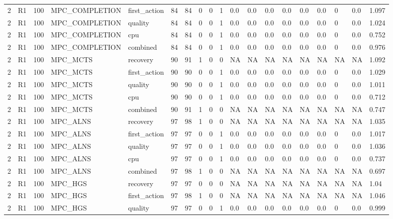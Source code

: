 \begin{tabular}{lllllllllllllllllll}
2 & R1 & 100 & MPC\_COMPLETION & first\_action & 84 & 84 & 0 & 0 & 1 & 0.0 & 0.0 & 0.0 & 0.0 & 0.0 & 0.0 & 0 & 0.0 & 1.097 \\
2 & R1 & 100 & MPC\_COMPLETION & quality & 84 & 84 & 0 & 0 & 1 & 0.0 & 0.0 & 0.0 & 0.0 & 0.0 & 0.0 & 0 & 0.0 & 1.024 \\
2 & R1 & 100 & MPC\_COMPLETION & cpu & 84 & 84 & 0 & 0 & 1 & 0.0 & 0.0 & 0.0 & 0.0 & 0.0 & 0.0 & 0 & 0.0 & 0.752 \\
2 & R1 & 100 & MPC\_COMPLETION & combined & 84 & 84 & 0 & 0 & 1 & 0.0 & 0.0 & 0.0 & 0.0 & 0.0 & 0.0 & 0 & 0.0 & 0.976 \\
2 & R1 & 100 & MPC\_MCTS & recovery & 90 & 91 & 1 & 0 & 0 & NA & NA & NA & NA & NA & NA & NA & NA & 1.092 \\
2 & R1 & 100 & MPC\_MCTS & first\_action & 90 & 90 & 0 & 0 & 1 & 0.0 & 0.0 & 0.0 & 0.0 & 0.0 & 0.0 & 0 & 0.0 & 1.029 \\
2 & R1 & 100 & MPC\_MCTS & quality & 90 & 90 & 0 & 0 & 1 & 0.0 & 0.0 & 0.0 & 0.0 & 0.0 & 0.0 & 0 & 0.0 & 1.011 \\
2 & R1 & 100 & MPC\_MCTS & cpu & 90 & 90 & 0 & 0 & 1 & 0.0 & 0.0 & 0.0 & 0.0 & 0.0 & 0.0 & 0 & 0.0 & 0.712 \\
2 & R1 & 100 & MPC\_MCTS & combined & 90 & 91 & 1 & 0 & 0 & NA & NA & NA & NA & NA & NA & NA & NA & 0.747 \\
2 & R1 & 100 & MPC\_ALNS & recovery & 97 & 98 & 1 & 0 & 0 & NA & NA & NA & NA & NA & NA & NA & NA & 1.035 \\
2 & R1 & 100 & MPC\_ALNS & first\_action & 97 & 97 & 0 & 0 & 1 & 0.0 & 0.0 & 0.0 & 0.0 & 0.0 & 0.0 & 0 & 0.0 & 1.017 \\
2 & R1 & 100 & MPC\_ALNS & quality & 97 & 97 & 0 & 0 & 1 & 0.0 & 0.0 & 0.0 & 0.0 & 0.0 & 0.0 & 0 & 0.0 & 1.036 \\
2 & R1 & 100 & MPC\_ALNS & cpu & 97 & 97 & 0 & 0 & 1 & 0.0 & 0.0 & 0.0 & 0.0 & 0.0 & 0.0 & 0 & 0.0 & 0.737 \\
2 & R1 & 100 & MPC\_ALNS & combined & 97 & 98 & 1 & 0 & 0 & NA & NA & NA & NA & NA & NA & NA & NA & 0.697 \\
2 & R1 & 100 & MPC\_HGS & recovery & 97 & 97 & 0 & 0 & 0 & NA & NA & NA & NA & NA & NA & NA & NA & 1.04 \\
2 & R1 & 100 & MPC\_HGS & first\_action & 97 & 98 & 1 & 0 & 0 & NA & NA & NA & NA & NA & NA & NA & NA & 1.046 \\
2 & R1 & 100 & MPC\_HGS & quality & 97 & 97 & 0 & 0 & 1 & 0.0 & 0.0 & 0.0 & 0.0 & 0.0 & 0.0 & 0 & 0.0 & 0.999 \\

\end{tabular}

